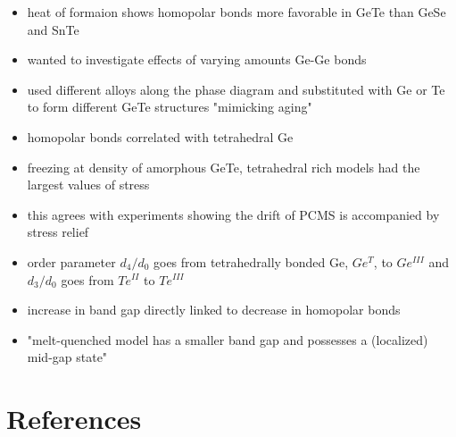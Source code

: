 \documentclass[3p,review,12pt]{elsarticle}
\begin{document}
\begin{itemize}
\begin{itemize}
		\item heat of formaion shows homopolar bonds more favorable in GeTe than GeSe and SnTe
		\item wanted to investigate effects of varying amounts Ge-Ge bonds
		\item used different alloys along the phase diagram and substituted with Ge or Te to form different GeTe structures "mimicking aging"
		\item homopolar bonds correlated with tetrahedral Ge
		\item freezing at density of amorphous GeTe, tetrahedral rich models had the largest values of stress
		\item this agrees with experiments showing the drift of PCMS is accompanied by stress relief
		\item order parameter $d_{4}/d_{0}$ goes from tetrahedrally bonded Ge, $Ge^{T}$, to $Ge^{III}$ and $d_{3}/d_{0}$ goes from $Te^{II}$ to $Te^{III}$
		\item increase in band gap directly linked to decrease in homopolar bonds
		\item "melt-quenched model has a smaller band gap and possesses a (localized) mid-gap state"
	\end{itemize}	
\end{itemize}



\section*{References}



\end{document}
